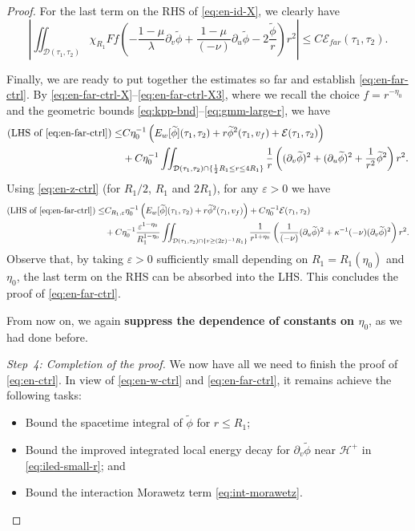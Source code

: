 \documentclass[10pt, reqno]{amsart}
\theoremstyle{definition}
\theoremstyle{remark}
\theoremstyle{conjecture}
\numberwithin{equation}{section}
\newcommand{\set}[1]{\{#1\}}
\newcommand{\rd}{\partial}
\newcommand{\0}{\emptyset}
\newcommand{\veps}{\varepsilon}
\newcommand{\kpp}{\kappa}
\newcommand{\lmb}{\lambda}
\newcommand{\calD}{\mathcal D}
\newcommand{\calE}{\mathcal E}
\newcommand{\calH}{\mathcal H}
\newcommand{\dur}{\nu}
\newcommand{\dvr}{\lmb}
\newcommand{\EH}{\calH^{+}}
\newcommand{\pfstep}[1]{\vspace{.5em} {\it \noindent #1.}}
\newcommand{\phibg}{\overline{\phi}}				%
\newcommand{\phidf}{\widetilde{\phi}}				%
\newcommand{\Abs}[1]{\left\vert #1 \right\vert}
\begin{document}
\begin{proof}
For the last term on the RHS of \eqref{eq:en-id-X}, we clearly have
\begin{equation} \label{eq:en-far-ctrl-X3}
\Abs{\iint_{\calD(\tau_{1}, \tau_{2})} \chi_{R_{1}} F f \left( - \frac{1-\mu}{\dvr} \rd_{v} \phidf + \frac{1-\mu}{(-\dur)} \rd_{u} \phidf - 2 \frac{\phidf}{r} \right) r^{2}}
\leq C \calE_{far}(\tau_{1}, \tau_{2}).
\end{equation}

Finally, we are ready to put together the estimates so far and establish \eqref{eq:en-far-ctrl}. By \eqref{eq:en-far-ctrl-X}--\eqref{eq:en-far-ctrl-X3}, where we recall the choice $f = r^{-\eta_{0}}$ and the geometric bounds \eqref{eq:kpp-bnd}--\eqref{eq:gmm-large-r}, we have
\begin{align*}
	(\hbox{LHS of \eqref{eq:en-far-ctrl}})
	\leq & C \eta_{0}^{-1} \left( E_{w}[\phidf](\tau_{1}, \tau_{2}) + r \phidf^{2}(\tau_{1}, v_{f}) + \calE(\tau_{1}, \tau_{2}) \right) \\
	& + C \eta_{0}^{-1} \iint_{\calD(\tau_{1}, \tau_{2}) \cap \set{\frac{1}{2} R_{1} \leq r \leq 4 R_{1}}} \frac{1}{r} \left( (\rd_{v} \phidf)^{2} + (\rd_{u} \phidf)^{2} + \frac{1}{r^{2}} \phidf^{2}\right) r^{2} .
\end{align*}
Using \eqref{eq:en-z-ctrl} (for $R_{1}/2$, $R_{1}$ and $2 R_{1}$), for any $\veps > 0$ we have
\begin{align*}
	(\hbox{LHS of \eqref{eq:en-far-ctrl}})
	\leq & C_{R_{1}, \veps} \eta_{0}^{-1} \left( E_{w}[\phidf](\tau_{1}, \tau_{2}) + r \phidf^{2}(\tau_{1}, v_{f}) \right) + C \eta_{0}^{-1} \calE (\tau_{1}, \tau_{2}) \\
	&  + C \eta_{0}^{-{1} }\frac{\veps^{1-\eta_{0}}}{R_{1}^{1-\eta_{0}}} \iint_{\calD(\tau_{1}, \tau_{2}) \cap \set{r \geq (2\veps)^{-1} R_{1}}} \frac{1}{r^{1+\eta_{0}}} 
	\left(  \frac{1}{(-\dur)} (\rd_{u} \phidf)^{2} + \kpp^{-1} (-\dur) (\rd_{v} \phidf)^{2} \right) r^{2}.
\end{align*}
Observe that, by taking $\veps > 0$ sufficiently small depending on $R_{1} = R_{1}(\eta_{0})$ and $\eta_{0}$, the last term on the RHS can be absorbed into the LHS. This concludes the proof of \eqref{eq:en-far-ctrl}.

From now on, we again {\bf suppress the dependence of constants on $\eta_{0}$}, as we had done before.

\pfstep{Step~4: Completion of the proof}
We now have all we need to finish the proof of \eqref{eq:en-ctrl}. In view of \eqref{eq:en-w-ctrl} and \eqref{eq:en-far-ctrl}, it remains achieve the following tasks:
\begin{itemize}
\item Bound the spacetime integral of $\phidf$ for $r\leq R_1$;
\item Bound the improved integrated local energy decay for $\rd_{v} \phidf$ near $\EH$ in \eqref{eq:iled-small-r}; and
\item Bound the interaction Morawetz term \eqref{eq:int-morawetz}.
\end{itemize}


\end{proof}
\end{document}

